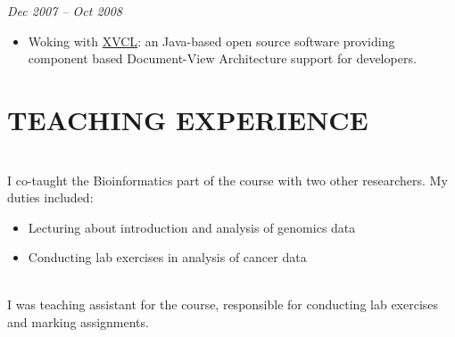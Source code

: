 \documentclass[margin, 10pt]{res} %
\begin{document}
\begin{resume}
 
{\sl \textbf{}} \hfill \textit{Dec 2007 -- Oct 2008} \\
{\color{RubineRed}{Computer Science Department, LUMS, Pakistan}} 
\begin{itemize} 
\item Woking with \href{http://www.sciencedirect.com/science/article/pii/S0167642304000978}{XVCL}: an Java-based open source software providing component based Document-View Architecture support for developers. 
\end{itemize} 

\section{TEACHING EXPERIENCE}
{\bf \color{Brown}{Molecular Oncology and Biostatistics, 2017}} \\
I co-taught the Bioinformatics part of the course with two other researchers. My duties included: 
\begin{itemize} 
\item Lecturing about introduction and analysis of genomics data 
\item Conducting lab exercises in analysis of cancer data
\end{itemize} 
{\bf \color{Brown}{Advanced Software Engineering, 2008}} \\
I was teaching assistant for the course, responsible for conducting lab exercises and marking assignments.



\end{resume}
\end{document}

